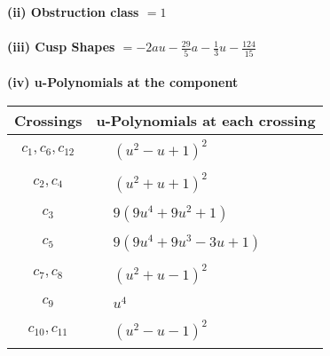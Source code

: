 \documentclass[1p]{elsarticle_modified}
\theoremstyle{definition}
\begin{document}
\flushleft \textbf{(ii) Obstruction class $= 1$}\\~\\
\flushleft \textbf{(iii) Cusp Shapes $= -2 a u-\frac{29}{5} a-\frac{1}{3} u-\frac{124}{15}$}\\~\\
\newpage\renewcommand{\arraystretch}{1}
\flushleft \textbf{(iv) u-Polynomials at the component}\newline \\
\begin{tabular}{m{50pt}|m{274pt}}
Crossings & \hspace{64pt}u-Polynomials at each crossing \\
\hline $$\begin{aligned}c_{1},c_{6},c_{12}\end{aligned}$$&$\begin{aligned}
&(u^2- u+1)^2
\end{aligned}$\\
\hline $$\begin{aligned}c_{2},c_{4}\end{aligned}$$&$\begin{aligned}
&(u^2+u+1)^2
\end{aligned}$\\
\hline $$\begin{aligned}c_{3}\end{aligned}$$&$\begin{aligned}
&9(9 u^4+9 u^2+1)
\end{aligned}$\\
\hline $$\begin{aligned}c_{5}\end{aligned}$$&$\begin{aligned}
&9(9 u^4+9 u^3-3 u+1)
\end{aligned}$\\
\hline $$\begin{aligned}c_{7},c_{8}\end{aligned}$$&$\begin{aligned}
&(u^2+u-1)^2
\end{aligned}$\\
\hline $$\begin{aligned}c_{9}\end{aligned}$$&$\begin{aligned}
&u^4
\end{aligned}$\\
\hline $$\begin{aligned}c_{10},c_{11}\end{aligned}$$&$\begin{aligned}
&(u^2- u-1)^2
\end{aligned}$\\
\hline
\end{tabular}\\~\\
\end{document}
